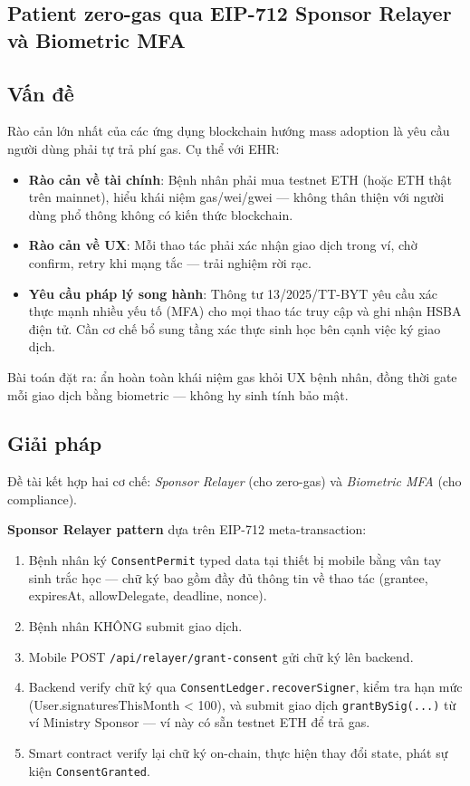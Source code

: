 \documentclass[../DoAn]{subfiles}
\begin{document}
\begin{itemize}
\section{Patient zero-gas qua EIP-712 Sponsor Relayer và Biometric MFA}

\subsection{Vấn đề}

Rào cản lớn nhất của các ứng dụng blockchain hướng mass adoption là yêu cầu người dùng phải tự trả phí gas. Cụ thể với EHR:

\begin{itemize}
    \item \textbf{Rào cản về tài chính}: Bệnh nhân phải mua testnet ETH (hoặc ETH thật trên mainnet), hiểu khái niệm gas/wei/gwei --- không thân thiện với người dùng phổ thông không có kiến thức blockchain.
    \item \textbf{Rào cản về UX}: Mỗi thao tác phải xác nhận giao dịch trong ví, chờ confirm, retry khi mạng tắc --- trải nghiệm rời rạc.
    \item \textbf{Yêu cầu pháp lý song hành}: Thông tư 13/2025/TT-BYT \cite{tt13_2025_byt} yêu cầu xác thực mạnh nhiều yếu tố (MFA) cho mọi thao tác truy cập và ghi nhận HSBA điện tử. Cần cơ chế bổ sung tầng xác thực sinh học bên cạnh việc ký giao dịch.
\end{itemize}

Bài toán đặt ra: ẩn hoàn toàn khái niệm gas khỏi UX bệnh nhân, đồng thời gate mỗi giao dịch bằng biometric --- không hy sinh tính bảo mật.

\subsection{Giải pháp}

Đề tài kết hợp hai cơ chế: \textit{Sponsor Relayer} (cho zero-gas) và \textit{Biometric MFA} (cho compliance).

\textbf{Sponsor Relayer pattern} dựa trên EIP-712 \cite{eip712} meta-transaction:

\begin{enumerate}
    \item Bệnh nhân ký \texttt{ConsentPermit} typed data tại thiết bị mobile bằng vân tay sinh trắc học --- chữ ký bao gồm đầy đủ thông tin về thao tác (grantee, expiresAt, allowDelegate, deadline, nonce).
    \item Bệnh nhân KHÔNG submit giao dịch.
    \item Mobile POST \texttt{/api/relayer/grant-consent} gửi chữ ký lên backend.
    \item Backend verify chữ ký qua \texttt{ConsentLedger.recoverSigner}, kiểm tra hạn mức (User.signaturesThisMonth < 100), và submit giao dịch \texttt{grantBySig(...)} từ ví Ministry Sponsor --- ví này có sẵn testnet ETH để trả gas.
    \item Smart contract verify lại chữ ký on-chain, thực hiện thay đổi state, phát sự kiện \texttt{ConsentGranted}.
\end{enumerate}


\end{itemize}
\end{document}
